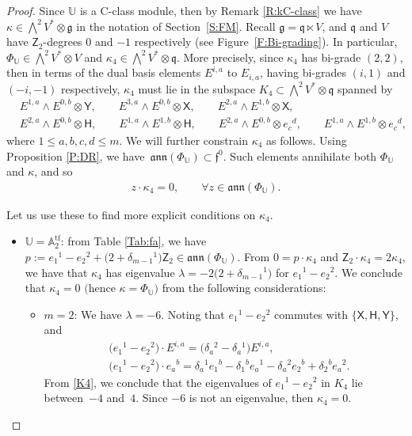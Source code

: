 \documentclass[pdftex]{sigma}%
\newcommand\tensor{\otimes}
\DeclareMathOperator{\tf}{tf}
\newcommand\fann{\mathfrak{ann}}
\newcommand\ff{\mathfrak{f}}
\newcommand\fg{\mathfrak{g}}
\newcommand\fq {\mathfrak{q}}
\newcommand\bbU{\mathbb{U}}
\newcommand\bbA{\mathbb{A}}
\newcommand\sfX{\mathsf{X}}
\newcommand\sfH{\mathsf{H}}
\newcommand\sfY{\mathsf{Y}}
\newcommand\sfZ{\mathsf{Z}}
\numberwithin{equation}{section}
\begin{document}
\begin{proof}
Since $\bbU$ is a C-class module, then by Remark \ref{R:kC-class} we have $\kappa \in \bigwedge^2 V^* \otimes \fg$ in the notation of Section~\ref{S:FM}. Recall $\fg = \fq \ltimes V$, and $\fq$ and $V$ have $\sfZ_2$-degrees $0$ and $-1$ respectively (see Figure~\ref{F:Bi-grading}). In particular, $\Phi_\bbU \in \bigwedge^2 V^\ast\tensor V$ and $\kappa_4 \in \bigwedge^2 V^\ast \tensor \fq$. More precisely, since $\kappa_4$ has bi-grade $(2,2)$, then in terms of the dual basis elements $E^{i,a}$ to $E_{i,a}$, having bi-grades $(i,1)$ and $(-i,-1)$ respectively, $\kappa_4$ must lie in the subspace $K_4 \subset \bigwedge^2 V^\ast \tensor \fq$ spanned by
\begin{align}
& E^{1,a} \wedge E^{0,b} \tensor \sfY, \qquad E^{3,a} \wedge E^{0,b} \tensor \sfX, \qquad E^{2,a} \wedge E^{1,b} \tensor \sfX,\nonumber\\
& E^{2,a} \wedge E^{0,b} \tensor \sfH, \qquad E^{1,a} \wedge E^{1,b} \tensor \sfH, \qquad E^{2,a} \wedge E^{0,b} \tensor e_c{}^d, \qquad E^{1,a} \wedge E^{1,b} \tensor e_c{}^d,\label{K4}
\end{align}
where $1 \le a, b,c,d \le m$. We will further constrain $\kappa_4$ as follows. Using Proposition \ref{P:DR}, we have~$\fann(\Phi_\bbU) \subset \ff^0$. Such elements annihilate both $\Phi_\bbU$ and $\kappa$, and so
\begin{align*}%
z \cdot \kappa_4 = 0, \qquad \forall z \in \fann(\Phi_\bbU).
\end{align*}
	
Let us use these to find more explicit conditions on $\kappa_4$.
\begin{itemize}\itemsep=0pt
\item [(1)] $\bbU = \bbA_2^{\tf}$: from Table {\rm \ref{Tab:fa}}, we have $p:=e_1{}^1 - e_2{}^2 + \bigl(2 + \delta_{m-1}{}^1\bigr)\sfZ_2 \in \fann(\Phi_\bbU)$. From $0 = p\cdot \kappa_4$ and $\sfZ_2 \cdot \kappa_4 = 2\kappa_4$, we have that $\kappa_4$ has eigenvalue $\lambda = -2\bigl(2 + \delta_{m-1}{}^1\bigr)$ for $e_1{}^1 - e_2{}^2$. We conclude that $\kappa_4 = 0$ $($hence $\kappa = \Phi_\bbU)$ from the following considerations:
\begin{itemize}\itemsep=0pt
\item[$(i)$] $m=2$: We have $\lambda = -6$. Noting that $e_1{}^1 - e_2{}^2$ commutes with $\{\sfX, \sfH, \sfY\}$, and
\begin{align*}%
&\bigl(e_1{}^1 - e_2{}^2\bigr)\cdot E^{i,a} = \bigl(\delta_a{}^2-\delta_a{}^1\bigr)E^{i,a}, \\
&\bigl(e_1{}^1 - e_2{}^2\bigr)\cdot e_a{}^b = \delta_a{}^1e_1{}^b-\delta_1{}^b e_a{}^1-\delta_a{}^2e_2{}^b + \delta_2{}^b e_a{}^2.
\end{align*}
From \eqref{K4}, we conclude that the eigenvalues of $e_1{}^1 - e_2{}^2$ in $K_4$ lie between~$-4$ and~$4$. Since $-6$ is not an eigenvalue, then $\kappa_4 = 0$.
			

\end{itemize}
\end{itemize}
\end{proof}
\end{document}
